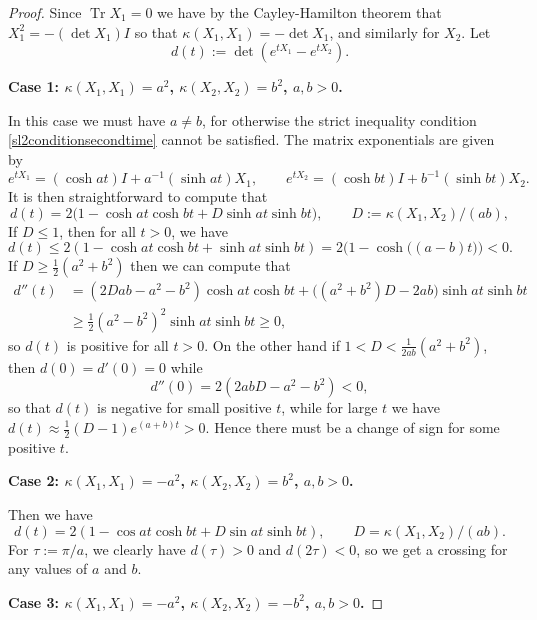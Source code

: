 \documentclass[oneside, 11pt]{amsart}
\numberwithin{equation}{section}
\DeclareMathOperator{\Tr}{Tr}
\newcommand{\simpkill}{\kappa}
\newcommand{\mattyone}{X_1}
\newcommand{\mattytwo}{X_2}
\begin{document}
   

\begin{proof}
    Since $\Tr{\mattyone}=0$ we have by the Cayley-Hamilton theorem that $\mattyone^2 = -(\det{\mattyone}) I$ so that $\simpkill(\mattyone,\mattyone) = -\det{\mattyone}$, and similarly for $\mattytwo$. Let 
    $$d(t) := \det{(e^{t\mattyone}-e^{t\mattytwo})}.$$
 

\textbf{Case 1: $\simpkill(\mattyone,\mattyone)=a^2$, $\simpkill(\mattytwo,\mattytwo)=b^2$, $a,b>0$.} 

    In this case we must have $a\ne b$, for otherwise the strict inequality condition \eqref{sl2conditionsecondtime} cannot be satisfied.
    The matrix exponentials are given by 
    $$ e^{t\mattyone} = (\cosh{at}) I + a^{-1}(\sinh{at}) \mattyone, \qquad e^{t\mattytwo} = (\cosh{bt}) I + b^{-1}(\sinh{bt}) \mattytwo. $$
    It is then straightforward to compute that 
\begin{equation*}%
    d(t) = 2\big( 1-\cosh{at}\cosh{bt} + D \sinh{at}\sinh{bt}\big), \qquad D:=\simpkill(\mattyone,\mattytwo)/(ab), 
    \end{equation*}  
If $D\le 1$, then for all $t>0$, we have 
    $$ d(t) \le 2(1-\cosh{at}\cosh{bt} + \sinh{at}\sinh{bt}) = 2\big(1 - 
    \cosh{\big((a-b)t\big)}\big) < 0. $$
    If $D\ge \tfrac{1}{2}(a^2+b^2)$ then we can compute that \begin{align*}
        d''(t) &= (2Dab-a^2-b^2) \cosh{at}\cosh{bt} + \big( (a^2+b^2)D - 2ab\big) \sinh{at}\sinh{bt} \\
        &\ge \tfrac{1}{2} (a^2-b^2)^2 \sinh{at}\sinh{bt}\ge 0,
        \end{align*}
    so $d(t)$ is positive for all $t>0$. 
    On the other hand if $1<D<\tfrac{1}{2ab}(a^2+b^2)$, then $d(0)=d'(0)=0$ while $$d''(0) = 2(2abD-a^2-b^2) < 0,$$
    so that $d(t)$ is negative for small positive $t$,
    while for large $t$ we have $d(t) \approx \tfrac{1}{2}(D-1)e^{(a+b)t}>0$. Hence there must be a change of sign for some positive $t$.

    \textbf{Case 2: $\simpkill(\mattyone,\mattyone)=-a^2$, $\simpkill(\mattytwo,\mattytwo)=b^2$, $a,b>0$.} 
    
    Then we have 
    $$d(t) = 2(1-\cos{at} \cosh{bt} + D\sin{at} \sinh{bt}), \qquad D = \simpkill(\mattyone,\mattytwo)/(ab). $$
    For $\tau:=\pi/a$, we clearly have $d(\tau)>0$ and $d(2\tau)<0$, so we get a crossing for any values of $a$ and $b$. 

    \textbf{Case 3: $\simpkill(\mattyone,\mattyone)=-a^2$, $\simpkill(\mattytwo,\mattytwo)=-b^2$, $a,b>0$.}  


\end{proof}
\end{document}
